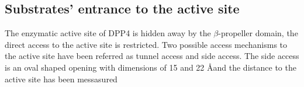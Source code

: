 \subsection{Substrates' entrance to the active site}

The enzymatic active site of DPP4 is hidden away by the $\beta$-propeller domain, the direct access to the active site is restricted. Two possible access mechanisms to the active site have been referred as tunnel access and side access. The side access is an oval shaped opening with dimensions of 15 and 22 \AA and the distance to the active site has been messasured